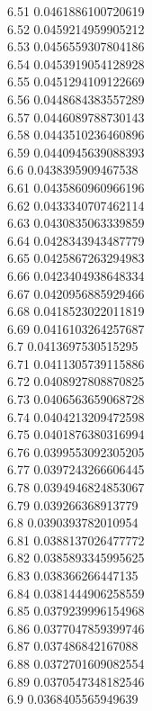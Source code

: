 {6.51	0.0461886100720619\\
6.52	0.0459214959905212\\
6.53	0.0456559307804186\\
6.54	0.0453919054128928\\
6.55	0.0451294109122669\\
6.56	0.0448684383557289\\
6.57	0.0446089788730143\\
6.58	0.0443510236460896\\
6.59	0.0440945639088393\\
6.6	0.0438395909467538\\
6.61	0.0435860960966196\\
6.62	0.0433340707462114\\
6.63	0.0430835063339859\\
6.64	0.0428343943487779\\
6.65	0.0425867263294983\\
6.66	0.0423404938648334\\
6.67	0.0420956885929466\\
6.68	0.0418523022011819\\
6.69	0.0416103264257687\\
6.7	0.0413697530515295\\
6.71	0.0411305739115886\\
6.72	0.0408927808870825\\
6.73	0.0406563659068728\\
6.74	0.0404213209472598\\
6.75	0.0401876380316994\\
6.76	0.0399553092305205\\
6.77	0.0397243266606445\\
6.78	0.0394946824853067\\
6.79	0.039266368913779\\
6.8	0.0390393782010954\\
6.81	0.0388137026477772\\
6.82	0.0385893345995625\\
6.83	0.038366266447135\\
6.84	0.0381444906258559\\
6.85	0.0379239996154968\\
6.86	0.0377047859399746\\
6.87	0.037486842167088\\
6.88	0.0372701609082554\\
6.89	0.0370547348182546\\
6.9	0.0368405565949639\\
}
